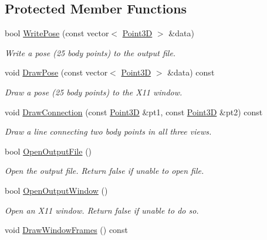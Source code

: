 \subsection*{Protected Member Functions}
\begin{DoxyCompactItemize}
\item 
\hypertarget{classPoseDisplay_af9f9376866ce200739343b6ea5a9f2f4}{}bool \hyperlink{classPoseDisplay_af9f9376866ce200739343b6ea5a9f2f4}{Write\+Pose} (const vector$<$ \hyperlink{classPoint3D}{Point3\+D} $>$ \&data)\label{classPoseDisplay_af9f9376866ce200739343b6ea5a9f2f4}

\begin{DoxyCompactList}\small\item\em Write a pose (25 body points) to the output file. \end{DoxyCompactList}\item 
\hypertarget{classPoseDisplay_af54050c57f676a23c6b5bdabdd0947db}{}void \hyperlink{classPoseDisplay_af54050c57f676a23c6b5bdabdd0947db}{Draw\+Pose} (const vector$<$ \hyperlink{classPoint3D}{Point3\+D} $>$ \&data) const \label{classPoseDisplay_af54050c57f676a23c6b5bdabdd0947db}

\begin{DoxyCompactList}\small\item\em Draw a pose (25 body points) to the X11 window. \end{DoxyCompactList}\item 
\hypertarget{classPoseDisplay_aca5c1b0509ca136e5de383cbc9d7a1eb}{}void \hyperlink{classPoseDisplay_aca5c1b0509ca136e5de383cbc9d7a1eb}{Draw\+Connection} (const \hyperlink{classPoint3D}{Point3\+D} \&pt1, const \hyperlink{classPoint3D}{Point3\+D} \&pt2) const \label{classPoseDisplay_aca5c1b0509ca136e5de383cbc9d7a1eb}

\begin{DoxyCompactList}\small\item\em Draw a line connecting two body points in all three views. \end{DoxyCompactList}\item 
\hypertarget{classPoseDisplay_af7cab412d8dab3ea4f5482a27fe2dcab}{}bool \hyperlink{classPoseDisplay_af7cab412d8dab3ea4f5482a27fe2dcab}{Open\+Output\+File} ()\label{classPoseDisplay_af7cab412d8dab3ea4f5482a27fe2dcab}

\begin{DoxyCompactList}\small\item\em Open the output file. Return false if unable to open file. \end{DoxyCompactList}\item 
bool \hyperlink{classPoseDisplay_a544a1d80438850ccfcc45107706de6cd}{Open\+Output\+Window} ()
\begin{DoxyCompactList}\small\item\em Open an X11 window. Return false if unable to do so. \end{DoxyCompactList}\item 
\hypertarget{classPoseDisplay_a0a2636aa2f67254c5de8f18c46660aeb}{}void \hyperlink{classPoseDisplay_a0a2636aa2f67254c5de8f18c46660aeb}{Draw\+Window\+Frames} () const \label{classPoseDisplay_a0a2636aa2f67254c5de8f18c46660aeb}


\end{DoxyCompactItemize}
